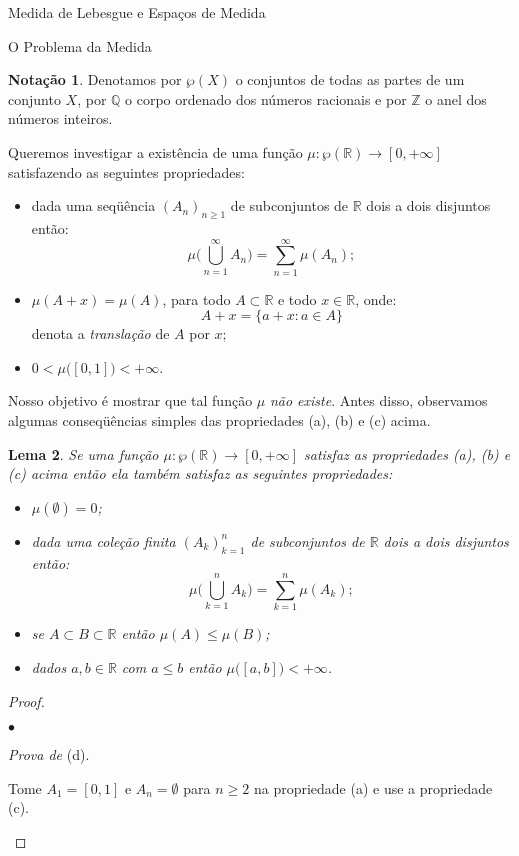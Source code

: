 \documentclass[oneside,final,11pt]{amsbook}
\newcommand{\R}{\mathds R}
\newcommand{\Q}{\mathds Q}
\newcommand{\Z}{\mathds Z}
\newcounter{contador}
\newenvironment{bulletindent}{\setcounter{contador}{0}
\begin{list} {$\bullet$}
{\usecounter{contador}
\setlength{\leftmargin}{10pt}
\setlength{\rightmargin}{10pt}
\setlength{\labelsep}{5pt}
\setlength{\itemsep}{10pt}
\setlength{\topsep}{10pt}}}
{\end{list}}
\theoremstyle{remark}\newtheorem{exercise}{Exercício}[chapter]
\theoremstyle{remark}\newtheorem{*exercise}[exercise]{\hbox to 0pt{\hskip 0pt minus 1fil*}Exercício}
\theoremstyle{definition}\newtheorem{exdefin}{Definição}[chapter]
\theoremstyle{plain}\newtheorem{teo}{Teorema}[section]
\theoremstyle{plain}\newtheorem{lem}[teo]{Lema}
\theoremstyle{plain}\newtheorem{prop}[teo]{Proposição}
\theoremstyle{plain}\newtheorem{cor}[teo]{Corolário}
\theoremstyle{definition}\newtheorem{defin}[teo]{Definição}
\theoremstyle{remark}\newtheorem{rem}[teo]{Observação}
\theoremstyle{definition}\newtheorem{notation}[teo]{Notação}
\theoremstyle{definition}\newtheorem{convention}[teo]{Convenção}
\theoremstyle{definition}\newtheorem{example}[teo]{Exemplo}
\numberwithin{section}{chapter}
\numberwithin{equation}{section}
\begin{document}
\begin{chapter}{Medida de Lebesgue e Espaços de Medida}
\begin{section}{O Problema da Medida}

\begin{notation}
Denotamos por $\wp(X)$ o conjuntos de todas as partes de um conjunto $X$,
por $\Q$\index[simbolos]{$\Q$} o corpo ordenado dos números racionais e por $\Z$\index[simbolos]{$\Z$} o anel dos números inteiros.
\end{notation}

Queremos investigar a existência de uma função $\mu:\wp(\R)\to[0,+\infty]$ satisfazendo as seguintes
propriedades:
\begin{itemize}
\item[(a)] dada uma seqüência $(A_n)_{n\ge1}$ de subconjuntos de $\R$ dois a dois disjuntos então:
\[\mu\Big(\bigcup_{n=1}^\infty A_n\Big)=\sum_{n=1}^{\infty}\mu(A_n);\]
\item[(b)] $\mu(A+x)=\mu(A)$, para todo $A\subset\R$ e todo $x\in\R$, onde:
\[A+x=\big\{a+x:a\in A\big\}\]
denota a {\em translação\/} de $A$ por $x$;
\item[(c)] $0<\mu\big([0,1]\big)<+\infty$.
\end{itemize}
Nosso objetivo é mostrar que tal função $\mu$ {\em não existe}. Antes disso, observamos algumas
conseqüências simples das propriedades (a), (b) e (c) acima.

\begin{lem}\label{thm:lemdefg}
Se uma função $\mu:\wp(\R)\to[0,+\infty]$ satisfaz as propriedades (a), (b) e (c) acima então
ela também satisfaz as seguintes propriedades:
\begin{itemize}
\item[(d)] $\mu(\emptyset)=0$;
\item[(e)] dada uma coleção finita $(A_k)_{k=1}^n$ de subconjuntos de $\R$ dois a dois disjuntos
então:
\[\mu\Big(\bigcup_{k=1}^n A_k\Big)=\sum_{k=1}^n\mu(A_k);\]
\item[(f)] se $A\subset B\subset\R$ então $\mu(A)\le\mu(B)$;
\item[(g)] dados $a,b\in\R$ com $a\le b$ então $\mu\big([a,b]\big)<+\infty$.
\end{itemize}
\end{lem}
\begin{proof}\
\begin{bulletindent}
\item {\em Prova de\/} (d).

Tome $A_1=[0,1]$ e $A_n=\emptyset$ para $n\ge2$ na propriedade (a) e use a propriedade (c).


\end{bulletindent}
\end{proof}
\end{section}
\end{chapter}
\end{document}
